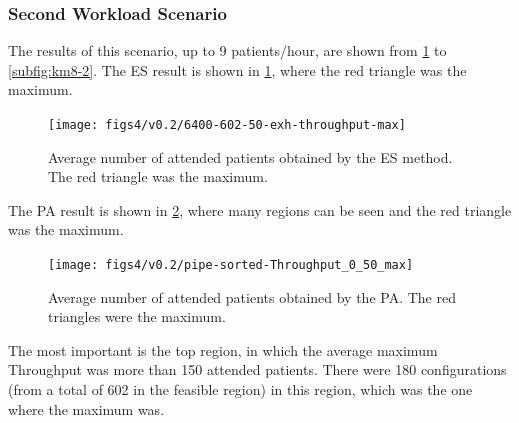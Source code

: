 \documentclass[11pt]{article} %
\begin{document}

\clearpage




\subsubsection{Second Workload Scenario}
\label{ssub:Case-Study-2A}

The results of this scenario, up to 9 patients/hour, are shown from
\ref{subfig:es8-2} to \ref{subfig:km8-2}. The ES result is shown
in \ref{subfig:es8-2}, where the red triangle was the maximum. 
\begin{figure}[H]
\centering{}\texttt{[image: figs4/v0.2/6400-602-50-exh-throughput-max]}\caption{Average number of attended patients obtained by the ES method. The
red triangle was the maximum.\label{subfig:es8-2}}
\end{figure}


The PA result is shown in \ref{subfig:pipe8-2}, where many regions
can be seen and the red triangle was the maximum. 
\begin{figure}[H]
\centering{}\texttt{[image: figs4/v0.2/pipe-sorted-Throughput\_0\_50\_max]}\caption{Average number of attended patients obtained by the PA. The red triangles
were the maximum.\label{subfig:pipe8-2}}
\end{figure}
 The most important is the top region, in which the average maximum
Throughput was more than 150 attended patients. There were 180 configurations
(from a total of 602 in the feasible region) in this region, which
was the one where the maximum was.

\end{document}
